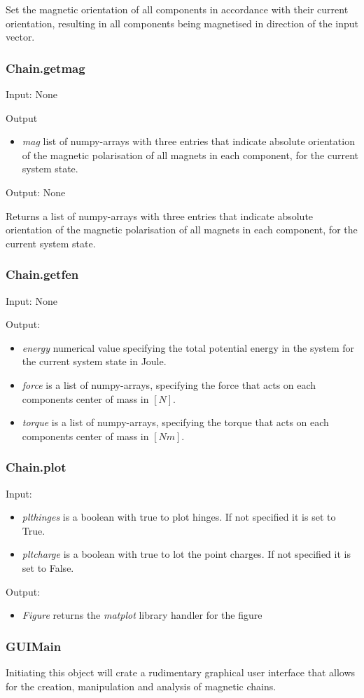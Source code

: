 Set the magnetic orientation of all components in accordance with their current orientation, resulting in all components being magnetised in direction of the input vector.

\subsubsection{Chain.get\textunderscore mag}
Input: None

Output
\begin{itemize}
    \item \textit{mag}  list of numpy-arrays with three entries that indicate absolute orientation of the magnetic polarisation of all magnets in each component, for the current system state.
\end{itemize}
Output: None

Returns a list of numpy-arrays with three entries that indicate absolute orientation of the magnetic polarisation of all magnets in each component, for the current system state.

\subsubsection{Chain.get\textunderscore fen}
Input: None

Output:
\begin{itemize}
    \item \textit{energy} numerical value specifying the total potential energy in the system for the current system state in Joule.
    \item \textit{force} is a list of numpy-arrays, specifying the force that acts on each components center of mass in  $[\unit{N}]$.
    \item \textit{torque} is a list of numpy-arrays, specifying the torque that acts on each components center of mass in $[\unit{Nm}]$.
\end{itemize}

\subsubsection{Chain.plot}
Input: 
\begin{itemize}
    \item \textit{plt\textunderscore hinges} is a boolean with true to plot hinges. If not specified it is set to True.
    \item \textit{plt\textunderscore charge} is a boolean with true to lot the point charges. If not specified it is set to False.
\end{itemize}

Output:
\begin{itemize}
    \item \textit{Figure} returns the \textit{matplot} library handler for the figure
\end{itemize}

\subsubsection{GUIMain}
Initiating this object will crate a rudimentary graphical user interface that allows for the creation, manipulation and analysis of magnetic chains.
